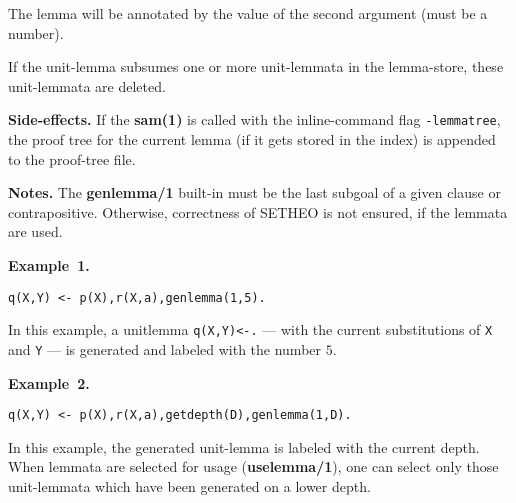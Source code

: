 The lemma will be annotated by the value of the second argument
(must be a number).

If the unit-lemma subsumes one or more unit-lemmata in the lemma-store,
these unit-lemmata are deleted.

\vspace*{0.5cm}
\noindent
{\bf Side-effects.}
If the {\bf sam(1)} is called with the inline-command flag {\tt -lemmatree},
the proof tree for the current lemma (if it gets stored in the index)
is appended to the proof-tree file.

\vspace*{0.5cm}
\noindent
{\bf Notes.}
The {\bf genlemma/1} built-in must be the last subgoal of a given
clause or contrapositive.
Otherwise, correctness of SETHEO is not ensured, if the lemmata are
used.

\vspace*{0.5cm}
\noindent
{\bf Example~1.}
\begin{verbatim}
q(X,Y) <- p(X),r(X,a),genlemma(1,5).
\end{verbatim}

In this example, a unitlemma {\tt q(X,Y)<-.} --- with the current substitutions of {\tt X} and {\tt Y} --- is generated and labeled with the number $5$.

\vspace*{0.5cm}
\noindent
{\bf Example~2.}
\begin{verbatim}
q(X,Y) <- p(X),r(X,a),getdepth(D),genlemma(1,D).
\end{verbatim}

In this example, the generated unit-lemma is labeled with the current
depth. When lemmata are selected for usage ({\bf uselemma/1}), one
can select only those unit-lemmata which have been generated on a lower
depth.
